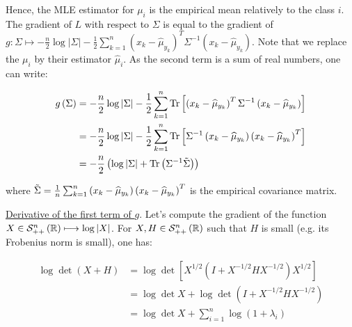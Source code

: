 \documentclass[a4paper, 11pt]{report}
\begin{document}
\begin{enumerate}[label=\alph*]
    Hence, the MLE estimator for $\mu_{i}$ is the empirical mean relatively to the class $i$. The gradient of $L$ with respect to $\Sigma$ is equal to the gradient of $g: \Sigma \mapsto - \frac{n}{2} \log \left| \Sigma \right| - \frac{1}{2} \sum_{k=1}^{n} \left( x_{k} - \widehat{\mu}_{y_{k}} \right)^{T} \Sigma^{-1} \left( x_{k} - \widehat{\mu}_{y_{k}} \right)$. Note that we replace the $\mu_{i}$ by their estimator $\widehat{\mu}_{i}$. As the second term is a sum of real numbers, one can write:
    
    \begin{equation*}
        \begin{aligned}
        g \left( \Sigma \right) &= - \frac{n}{2} \log \left| \Sigma \right| - \frac{1}{2} \sum_{k=1}^{n} \operatorname{Tr} \left[ \left( x_{k} - \widehat{\mu}_{y_{k}} \right)^{T} \Sigma^{-1} \left( x_{k} - \widehat{\mu}_{y_{k}} \right) \right] \\
        &= - \frac{n}{2} \log \left| \Sigma \right| - \frac{1}{2} \sum_{k=1}^{n} \operatorname{Tr} \left[ \Sigma^{-1} \left( x_{k} - \widehat{\mu}_{y_{k}} \right) \left( x_{k} - \widehat{\mu}_{y_{k}} \right)^{T} \right] \\
        &= - \frac{n}{2} \left( \log \left| \Sigma \right| + \operatorname{Tr} \left( \Sigma^{-1} \Tilde{\Sigma} \right) \right)
        \end{aligned}
    \end{equation*}
    
    where $\Tilde{\Sigma} = \frac{1}{n} \sum_{k=1}^{n} \left( x_{k} - \widehat{\mu}_{y_{k}} \right) \left( x_{k} - \widehat{\mu}_{y_{k}} \right)^{T}$ is the empirical covariance matrix. 
    
    \underline{Derivative of the first term of $g$}. Let's compute the gradient of the function $X \in \mathcal{S}_{++}^{n} \left( \mathbb{R} \right) \longmapsto \log \left| X \right|$. For $X, H \in \mathcal{S}_{++}^{n} \left( \mathbb{R} \right)$ such that $H$ is small (e.g. its Frobenius norm is small), one has:
    
    \begin{equation*}
        \begin{aligned}
        \log \det \left( X + H \right) &= \log \det \left[ X^{1/2} \left( I + X^{-1/2}HX^{-1/2} \right) X^{1/2} \right] \\
        &= \log \det X + \log \det \left( I + X^{-1/2}HX^{-1/2} \right) \\
        &= \log \det X + \sum_{i=1}^{n} \log \left( 1 + \lambda_{i} \right)
        \end{aligned}
    \end{equation*}
    \vspace*{.6em}
    

\end{enumerate}
\end{document}
